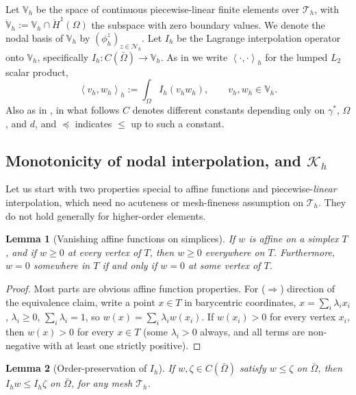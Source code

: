 \documentclass[12pt]{amsart}
\newtheorem{lemma}{Lemma}
\theoremstyle{definition}
\newcommand{\Om}{\Omega}
\newcommand{\Th}{\mathcal{T}_h}
\newcommand{\Vh}{\mathbb{V}_h}
\newcommand{\Vhr}{\mathring{\mathbb{V}}_h}
\newcommand{\Nh}{\mathcal{N}_h}
\newcommand{\Ih}{I_h}
\newcommand{\Kh}{\mathcal{K}_h}
\begin{document}
Let $\Vh$ be the space of continuous piecewise-linear finite elements over $\Th$, with
$\Vhr := \Vh \cap \mathring H^1(\Om)$ the subspace with zero boundary values.  We denote the nodal basis of $\Vh$ by $(\phi_h^z)_{z \in \Nh}$.  Let $\Ih$ be the Lagrange interpolation operator onto $\Vh$, specifically $\Ih:C(\bar\Om) \to \Vh$.  As in \cite{NSV03} we write $\left< \cdot,\cdot\right>_h$ for the lumped $L_2$ scalar product,
\begin{equation}
\label{eq:lumped}
\left< v_h, w_h\right>_h := \int_\Om \Ih(v_h w_h), \qquad v_h, w_h \in \Vh.
\end{equation}
Also as in \cite{NSV03}, in what follows $C$ denotes different constants depending only on $\gamma^*$, $\Om$, and $d$, and $\preceq$ indicates $\le$ up to such a constant.


\subsection{Monotonicity of nodal interpolation, and \texorpdfstring{$\Kh$}{Kh}}

Let us start with two properties special to affine functions and piecewise-\emph{linear} interpolation, which need no acuteness or mesh-fineness assumption on $\Th$.  They do not hold generally for higher-order elements.

\begin{lemma}[Vanishing affine functions on simplices]
\label{lem:affine}
If $w$ is affine on a simplex $T$, and if $w \ge 0$ at every vertex of $T$, then $w\ge 0$ everywhere on $T$.  Furthermore, $w = 0$ somewhere in $T$ if and only if $w = 0$ at some vertex of $T$.
\end{lemma}

\begin{proof}
Most parts are obvious affine function properties.  For ($\Rightarrow$) direction of the equivalence claim, write a point $x \in T$ in barycentric coordinates, $x = \sum_i \lambda_i x_i$, $\lambda_i \ge 0$, $\sum_i \lambda_i = 1$, so $w(x) = \sum_i \lambda_i w(x_i)$.  If $w(x_i) > 0$ for every vertex $x_i$, then $w(x) > 0$ for every $x \in T$ (some $\lambda_i > 0$ always, and all terms are non-negative with at least one strictly positive).
\end{proof}

\begin{lemma}[Order-preservation of $I_h$]
\label{lem:monotone}
If $w, \zeta \in C(\bar\Om)$ satisfy $w \le \zeta$ on $\bar\Om$, then
$\Ih w \le \Ih \zeta$ on $\bar\Om$, for any mesh $\Th$.
\end{lemma}
\end{document}
